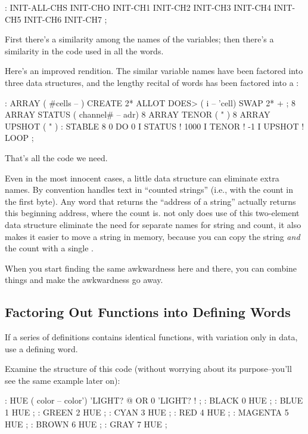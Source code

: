 \begin{Code} 
: INIT-ALL-CHS    INIT-CHO  INIT-CH1  INIT-CH2  INIT-CH3
   INIT-CH4  INIT-CH5  INIT-CH6  INIT-CH7 ;
\end{Code}
First there's a similarity among the names of the variables; then
there's a similarity in the code used in all the 
words.

Here's an improved rendition. The similar variable names have been
factored into three data structures, and the lengthy recital of
 words has been factored into a :

\begin{Code}
: ARRAY  ( #cells -- )  CREATE  2* ALLOT
   DOES> ( i -- 'cell)  SWAP  2* + ; 
8 ARRAY STATUS  ( channel# -- adr)
8 ARRAY TENOR   (        "       )
8 ARRAY UPSHOT  (        "       )
: STABLE   8 0 DO  0 I STATUS !  1000 I TENOR ! 
   -1 I UPSHOT !  LOOP ;
\end{Code}
That's all the code we need.

Even in the most innocent cases, a little data structure can eliminate
extra names. By convention \Forth{} handles text in ``counted
strings'' (i.e., with the count in the first byte). Any word that
returns the ``address of a string'' actually returns this beginning
address, where the count is. not only does use of this two-element
data structure eliminate the need for separate names for string and
count, it also makes it easier to move a string in memory, because you
can copy the string \emph{and} the count with a single .

When you start finding the same awkwardness here and there, you can
combine things and make the awkwardness go away.

\subsection{{Factoring Out Functions into Defining Words}}

\begin{tip}
If a series of definitions contains identical functions, with
variation only in data, use a defining word.
\end{tip}
Examine the structure of this code (without worrying about its
purpose--you'll see the same example later on):

\begin{Code}
: HUE  ( color -- color') 
   'LIGHT? @  OR  0 'LIGHT? ! ;
: BLACK   0 HUE ;
: BLUE   1 HUE ;
: GREEN   2 HUE ;
: CYAN   3 HUE ;
: RED   4 HUE ;
: MAGENTA   5 HUE ;
: BROWN   6 HUE ;
: GRAY   7 HUE ;
\end{Code}

